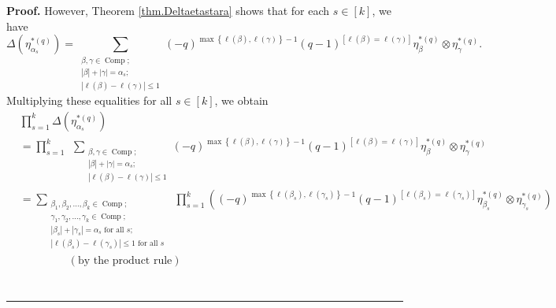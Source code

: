 \documentclass[numbers=enddot,12pt,final,onecolumn,notitlepage]{scrartcl}%
\theoremstyle{definition}
\newenvironment{proof}[1][Proof]{\noindent\textbf{#1.} }{\ \rule{0.5em}{0.5em}}
\let\sumnonlimits\sum
\let\prodnonlimits\prod
\renewcommand{\sum}{\sumnonlimits\limits}
\renewcommand{\prod}{\prodnonlimits\limits}
\begin{document}
\begin{proof}
However, Theorem \ref{thm.Deltaetastara} shows that for each $s\in\left[
k\right]  $, we have%
\[
\Delta\left(  \eta_{\alpha_{s}}^{\ast\left(  q\right)  }\right)
=\sum_{\substack{\beta,\gamma\in\operatorname*{Comp};\\\left\vert
\beta\right\vert +\left\vert \gamma\right\vert =\alpha_{s};\\\left\vert
\ell\left(  \beta\right)  -\ell\left(  \gamma\right)  \right\vert \leq
1}}\left(  -q\right)  ^{\max\left\{  \ell\left(  \beta\right)  ,\ell\left(
\gamma\right)  \right\}  -1}\left(  q-1\right)  ^{\left[  \ell\left(
\beta\right)  =\ell\left(  \gamma\right)  \right]  }\eta_{\beta}^{\ast\left(
q\right)  }\otimes\eta_{\gamma}^{\ast\left(  q\right)  }.
\]
Multiplying these equalities for all $s\in\left[  k\right]  $, we obtain%
\begin{align*}
&  \prod_{s=1}^{k}\Delta\left(  \eta_{\alpha_{s}}^{\ast\left(  q\right)
}\right) \\
&  =\prod_{s=1}^{k}\ \ \sum_{\substack{\beta,\gamma\in\operatorname*{Comp}%
;\\\left\vert \beta\right\vert +\left\vert \gamma\right\vert =\alpha
_{s};\\\left\vert \ell\left(  \beta\right)  -\ell\left(  \gamma\right)
\right\vert \leq1}}\left(  -q\right)  ^{\max\left\{  \ell\left(  \beta\right)
,\ell\left(  \gamma\right)  \right\}  -1}\left(  q-1\right)  ^{\left[
\ell\left(  \beta\right)  =\ell\left(  \gamma\right)  \right]  }\eta_{\beta
}^{\ast\left(  q\right)  }\otimes\eta_{\gamma}^{\ast\left(  q\right)  }\\
&  =\sum_{\substack{\beta_{1},\beta_{2},\ldots,\beta_{k}\in
\operatorname*{Comp};\\\gamma_{1},\gamma_{2},\ldots,\gamma_{k}\in
\operatorname*{Comp};\\\left\vert \beta_{s}\right\vert +\left\vert \gamma
_{s}\right\vert =\alpha_{s}\text{ for all }s;\\\left\vert \ell\left(
\beta_{s}\right)  -\ell\left(  \gamma_{s}\right)  \right\vert \leq1\text{ for
all }s}}\ \ \prod_{s=1}^{k}\left(  \left(  -q\right)  ^{\max\left\{
\ell\left(  \beta_{s}\right)  ,\ell\left(  \gamma_{s}\right)  \right\}
-1}\left(  q-1\right)  ^{\left[  \ell\left(  \beta_{s}\right)  =\ell\left(
\gamma_{s}\right)  \right]  }\eta_{\beta_{s}}^{\ast\left(  q\right)  }%
\otimes\eta_{\gamma_{s}}^{\ast\left(  q\right)  }\right) \\
&  \ \ \ \ \ \ \ \ \ \ \ \ \ \ \ \ \ \ \ \ \left(  \text{by the product
rule}\right) \\

\end{align*}
\end{proof}
\end{document}
